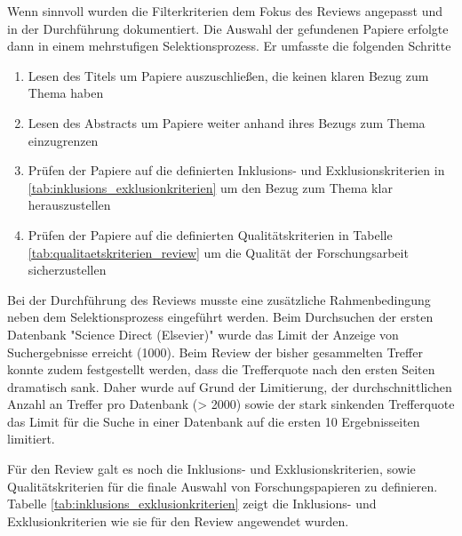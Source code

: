 Wenn sinnvoll wurden die Filterkriterien dem Fokus des Reviews angepasst und in der Durchführung dokumentiert. Die Auswahl der gefundenen Papiere erfolgte dann in einem mehrstufigen Selektionsprozess. Er umfasste die folgenden Schritte

\begin{enumerate}
    \item Lesen des Titels um Papiere auszuschließen, die keinen klaren Bezug zum Thema haben
    \item Lesen des Abstracts um Papiere weiter anhand ihres Bezugs zum Thema einzugrenzen
    \item Prüfen der Papiere auf die definierten Inklusions- und Exklusionskriterien in \ref{tab:inklusions_exklusionkriterien} um den Bezug zum Thema klar herauszustellen
    \item Prüfen der Papiere auf die definierten Qualitätskriterien in Tabelle \ref{tab:qualitaetskriterien_review} um die Qualität der Forschungsarbeit sicherzustellen
\end{enumerate}

Bei der Durchführung des Reviews musste eine zusätzliche Rahmenbedingung neben dem Selektionsprozess eingeführt werden. Beim Durchsuchen der ersten Datenbank "Science Direct (Elsevier)" wurde das Limit der Anzeige von Suchergebnisse erreicht (1000). Beim Review der bisher gesammelten Treffer konnte zudem festgestellt werden, dass die Trefferquote nach den ersten Seiten dramatisch sank. Daher wurde auf Grund der Limitierung, der durchschnittlichen Anzahl an Treffer pro Datenbank (> 2000) sowie der stark sinkenden Trefferquote das Limit für die Suche in einer Datenbank auf die ersten 10 Ergebnisseiten limitiert.

Für den Review galt es noch die Inklusions- und Exklusionskriterien, sowie Qualitätskriterien für die finale Auswahl von Forschungspapieren zu definieren. Tabelle \ref{tab:inklusions_exklusionkriterien} zeigt die Inklusions- und Exklusionkriterien wie sie für den Review angewendet wurden.

